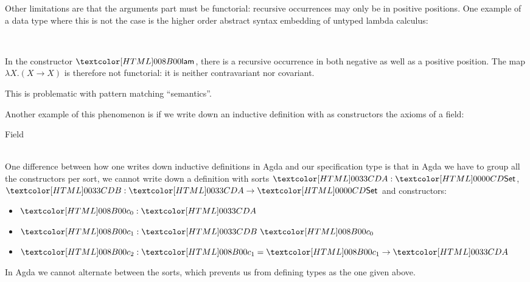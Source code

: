 Other limitations are that the arguments part must be functorial:
recursive occurrences may only be in positive positions. One example
of a data type where this is not the case is the higher order abstract
syntax embedding of untyped lambda calculus:
%
\begin{datatype}{\tttmty}{\Set}
  \constr{\ttapp}{\tttmty \to \tttmty \to \tttmty} \\
  \constr{\ttlam}{(\tttmty \to \tttmty) \to \tttmty}
\end{datatype}
%
In the constructor $\ttlam$, there is a recursive occurrence in both
negative as well as a positive position. The map
$\lambda X . (X \to X)$ is therefore not functorial: it is neither
contravariant nor covariant. 

This is problematic with pattern matching ``semantics''.

Another example of this phenomenon is if we write down an inductive
definition with as constructors the axioms of a field:
%
\begin{datatype}{Field}{\Set}
  \hdots \\
   \\
  \hdots 
\end{datatype}
%

One difference between how one writes down inductive definitions in
Agda and our specification type is that in Agda we have to group all
the constructors per sort, \ie we cannot write down a definition with
sorts $\Aty : \Set$, $\Bty : \Aty \to \Set$ and constructors:
%
\begin{itemize}
\item $\Aco : \Aty$
\item $\Bci : \Bty\ \Aco$
\item $\Acii : \Bci = \Bci \to \Aty$
\end{itemize}
%
In Agda we cannot alternate between the sorts, which prevents us from
defining types as the one given above.
